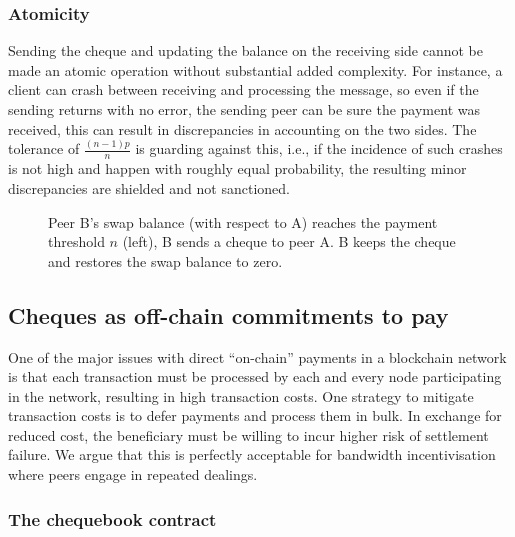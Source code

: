 \subsubsection{Atomicity}

Sending the cheque and updating the  balance on the receiving side cannot be made an atomic operation without substantial added complexity. For instance, a client can  crash between receiving and processing the message, so even if the sending returns with no error, the sending peer can be sure the payment was received, this can result in discrepancies in accounting on the two sides. The tolerance of $\frac{(n-1)p}{n}$ is guarding against this, i.e., if the incidence of such crashes is not high and happen with roughly equal probability, the resulting minor discrepancies are shielded and not sanctioned.

\begin{center}
\begin{figure}[htbp]

\caption[Cheque swap]{Peer B's swap balance (with respect to A) reaches the payment threshold $n$ (left),
B sends a cheque to peer A. B keeps the cheque and restores the swap balance to zero.}
\label{fig:chequeswap}
\end{figure}
\end{center}

\subsection{Cheques as off-chain commitments to pay}\label{sec:cheques}

One of the major issues with direct ``on-chain'' payments in a blockchain network is that each transaction must be processed by each and every node participating in the network, resulting in high transaction costs. One strategy to mitigate transaction costs is to defer payments and process them in bulk. In exchange for reduced cost, the beneficiary must be willing to incur higher risk of settlement failure. We argue that this is perfectly acceptable for bandwidth incentivisation where peers engage in repeated dealings.


\subsubsection{The chequebook contract}

